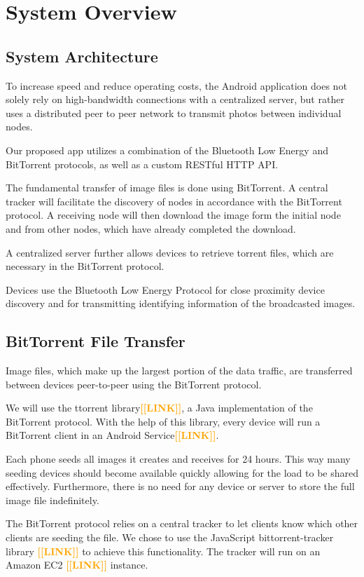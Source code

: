 \documentclass{report}
\newcommand{\todo}[1]{\textsf{\textbf{\textcolor{orange}{[[#1]]}}}}
\begin{document}
\section{System Overview}

\subsection{System Architecture}
To increase speed and reduce operating costs, the Android application does not solely rely on high-bandwidth connections with a centralized server, but rather uses a distributed peer to peer network to transmit photos between individual nodes.

Our proposed app utilizes a combination of the Bluetooth Low Energy and BitTorrent protocols, as well as a custom RESTful HTTP API.

The fundamental transfer of image files is done using BitTorrent. A central tracker will facilitate the discovery of nodes in accordance with the BitTorrent protocol. A receiving node will then download the image form the initial node and from other nodes, which have already completed the download.

A centralized server further allows devices to retrieve torrent files, which are necessary in the BitTorrent protocol.

Devices use the Bluetooth Low Energy Protocol for close proximity device discovery and for transmitting identifying information of  the broadcasted images.

\subsection{BitTorrent File Transfer}
Image files, which make up the largest portion of the data traffic, are transferred between devices peer-to-peer using the BitTorrent protocol.

We will use the ttorrent library\todo{LINK}, a Java implementation of the BitTorrent protocol. With the help of this library, every device will run a BitTorrent client in an Android Service\todo{LINK}.

Each phone seeds all images it creates and receives for 24 hours. This way many seeding devices should become available quickly allowing for the load to be shared effectively. Furthermore, there is no need for any device or server to store the full image file indefinitely.

The BitTorrent protocol relies on a central tracker to let clients know which other clients are seeding the file. We chose to use the JavaScript bittorrent-tracker library \todo{LINK} to achieve this functionality. The tracker will run on an Amazon EC2 \todo{LINK} instance.
\end{document}
